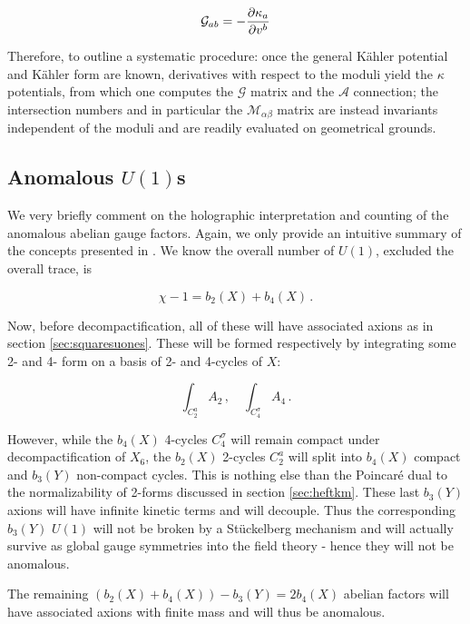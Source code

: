 \begin{equation}
	\mathcal{G}_{ab} = - \frac{\partial\kappa_a}{\partial v^b}
	\label{Gshortcut}
\end{equation}

Therefore, to outline a systematic procedure: once the general K\"ahler potential and K\"ahler form are known, derivatives with respect to the moduli yield the $\kappa$ potentials, from which one computes the $\mathcal{G}$ matrix and the $\mathcal{A}$ connection; the intersection numbers and in particular the $\mathcal{M}_{\alpha\beta}$ matrix are instead invariants independent of the moduli and are readily evaluated on geometrical grounds.

\subsection{Anomalous $U(1)$s}

We very briefly comment on the holographic interpretation and counting of the anomalous abelian gauge factors. Again, we only provide an intuitive summary of the concepts presented in \cite{MZ}. We know the overall number of $U(1)$, excluded the overall trace, is

\begin{equation}
	\chi - 1 =  b_2(X) + b_4(X)\,.
	\label{}
\end{equation}

Now, before decompactification, all of these will have associated axions as in section \ref{sec:squaresuones}. These will be formed respectively by integrating some 2- and 4- form on a basis of 2- and 4-cycles of $X$:


\begin{equation}
	\int_{\mbox{$C_2^a$}} A_2\,,\quad \int_{\mbox{$C_4^\sigma$}} A_4\,.
	\label{}
\end{equation}

However, while the $b_4(X)$ 4-cycles $C_4^\sigma$ will remain compact under decompactification of $X_6$, the $b_2(X)$ 2-cycles $C_2^a$ will split into $b_4(X)$ compact and $b_3(Y)$ non-compact cycles. This is nothing else than the Poincar\'e dual to the normalizability of 2-forms discussed in section \ref{sec:heftkm}. These last $b_3(Y)$ axions will have infinite kinetic terms and will decouple. Thus the corresponding $b_3(Y)$ $U(1)$ will not be broken by a St\"uckelberg mechanism and will actually survive as global gauge symmetries into the field theory - hence they will not be anomalous.

The remaining $(b_2(X) + b_4(X)) - b_3(Y) = 2b_4(X)$ abelian factors will have associated axions with finite mass and will thus be anomalous.

